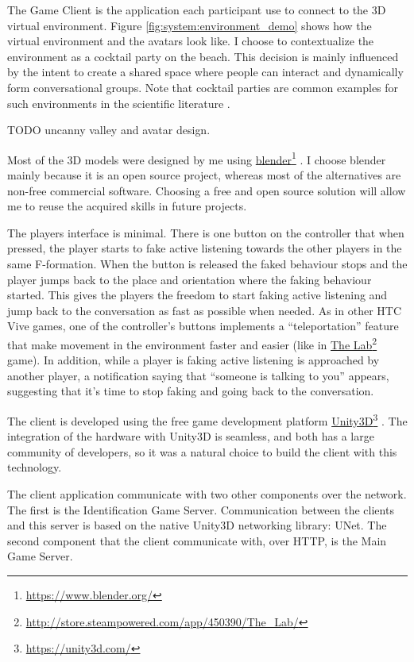 \documentclass[]{simple-thesis}
\newcommand\fnurl[2]{%
  \href{#2}{#1}\footnote{\url{#2}}%
}
\begin{document}
The Game Client is the application each participant use to connect to the 3D virtual environment.
Figure \ref{fig:system:environment_demo} shows how the virtual environment and the avatars look like.
I choose to contextualize the environment as a cocktail party on the beach.
This decision is mainly influenced by the intent to create a shared space where people can interact and dynamically form conversational groups.
Note that cocktail parties are common examples for such environments in the scientific literature \citep{Setti2015}.

TODO uncanny valley and avatar design.

Most of the 3D models were designed by me using \fnurl{blender}{https://www.blender.org/}.
I choose blender mainly because it is an open source project, whereas most of the alternatives are non-free commercial software.
Choosing a free and open source solution will allow me to reuse the acquired skills in future projects.

The players interface is minimal.
There is one button on the controller that when pressed, the player starts to fake active listening towards the other players in the same F-formation.
When the button is released the faked behaviour stops and the player jumps back to the place and orientation where the faking behaviour started.
This gives the players the freedom to start faking active listening and jump back to the conversation as fast as possible when needed.
As in other HTC Vive games, one of the controller's buttons implements a ``teleportation'' feature that make movement in the environment faster and easier (like in \fnurl{The Lab}{http://store.steampowered.com/app/450390/The_Lab/} game).
In addition, while a player is faking active listening is approached by another player, a notification saying that ``someone is talking to you'' appears, suggesting that it's time to stop faking and going back to the conversation.

The client is developed using the free game development platform \fnurl{Unity3D}{https://unity3d.com/}.
The integration of the hardware with Unity3D is seamless, and both has a large community of developers, so it was a natural choice to build the client with this technology.

The client application communicate with two other components over the network.
The first is the Identification Game Server.
Communication between the clients and this server is based on the native Unity3D networking library: UNet.
The second component that the client communicate with, over HTTP, is the Main Game Server.
\end{document}
